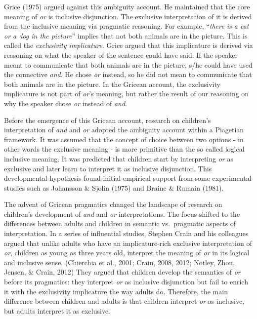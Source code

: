 \documentclass[10pt, letterpaper]{article}
\begin{document}
Grice (1975) argued against this ambiguity account. He maintained that
the core meaning of \emph{or} is inclusive disjunction. The exclusive
interpretation of it is derived from the inclusive meaning via pragmatic
reasoning. For example, ``\emph{there is a cat or a dog in the
picture}'' implies that not both animals are in the picture. This is
called the \emph{exclusivity implicature}. Grice argued that this
implicature is derived via reasoning on what the speaker of the sentence
could have said. If the speaker meant to communicate that both animals
are in the picture, s/he could have used the connective \emph{and}. He
chose \emph{or} instead, so he did not mean to communicate that both
animals are in the picture. In the Gricean account, the exclusivity
implicature is not part of \emph{or}'s meaning, but rather the result of
our reasoning on why the speaker chose \emph{or} instead of \emph{and}.

Before the emergence of this Gricean account, research on children's
interpretation of \emph{and} and \emph{or} adopted the ambiguity account
within a Piagetian framework. It was assumed that the concept of choice
between two options - in other words the exclusive meaning - is more
primitive than the so called logical inclusive meaning. It was predicted
that children start by interpreting \emph{or} as exclusive and later
learn to interpret it as inclusive disjunction. This developmental
hypothesis found initial empirical support from some experimental
studies such as Johansson \& Sjolin (1975) and Braine \& Rumain (1981).

The advent of Gricean pragmatics changed the landscape of research on
children's development of \emph{and} and \emph{or} interpretations. The
focus shifted to the differences between adults and children in semantic
vs.~pragmatic aspects of interpretation. In a series of influential
studies, Stephen Crain and his colleagues argued that unlike adults who
have an implicature-rich exclusive interpretation of \emph{or}, children
as young as three years old, interpret the meaning of \emph{or} in its
logical and inclusive sense. (Chierchia et al., 2001; Crain, 2008, 2012;
Notley, Zhou, Jensen, \& Crain, 2012) They argued that children develop
the semantics of \emph{or} before its pragmatics: they interpret
\emph{or} as inclusive disjunction but fail to enrich it with the
exclusivity implicature the way adults do. Therefore, the main
difference between children and adults is that children interpret
\emph{or} as inclusive, but adults interpret it as exclusive.
\end{document}
